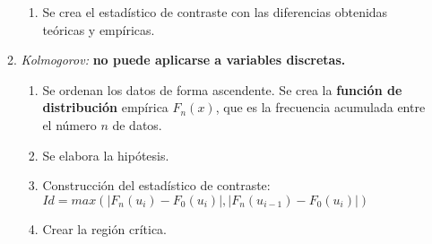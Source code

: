 \documentclass[a4paper, twocolumn, 10pt]{article}
\begin{document}
\begin{itemize}
\begin{enumerate}
\begin{enumerate}
			\item Se crea el estadístico de contraste con las diferencias obtenidas teóricas y empíricas.
		\end{enumerate}
		\item \textit{Kolmogorov:} \textbf{no puede aplicarse a variables discretas.}
		\begin{enumerate}
			\item Se ordenan los datos de forma ascendente. Se crea la \textbf{función de distribución} empírica $F_n(x)$, que es la frecuencia acumulada entre el número $n$ de datos.
			\item Se elabora la hipótesis.
			\item Construcción del estadístico de contraste: $Id = max \left(\left|F_n(u_i) - F_0(u_i)\right|,\left|F_n(u_{i-1}) - F_0(u_i)\right|\right)$
			\item Crear la región crítica.
		\end{enumerate}
	\end{enumerate}
\end{itemize}
\end{document}
